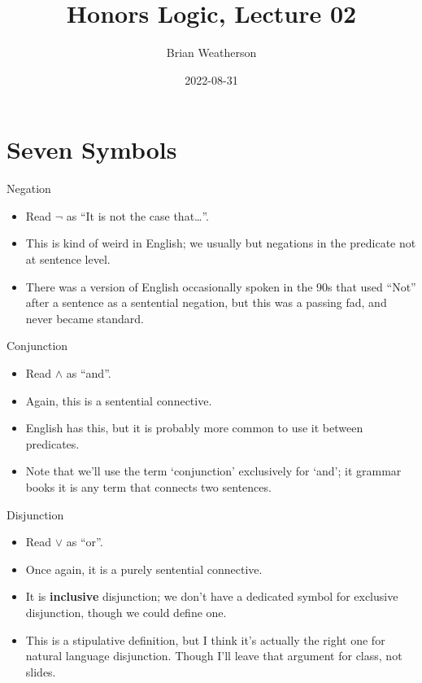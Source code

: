 \documentclass[
  17pt,
  letterpaper,
  ignorenonframetext,
  aspectratio=169,
]{beamer}
\title{Honors Logic, Lecture 02}
\author{Brian Weatherson}
\date{2022-08-31}
\providecommand{\tightlist}{%
  \setlength{\itemsep}{0pt}\setlength{\parskip}{0pt}}\usepackage{longtable,booktabs,array}
\begin{document}
\frame{\titlepage}
\ifdefined\Shaded\renewenvironment{Shaded}{\begin{tcolorbox}[enhanced, sharp corners, boxrule=0pt, frame hidden, breakable, interior hidden, borderline west={3pt}{0pt}{shadecolor}]}{\end{tcolorbox}}\fi

\hypertarget{seven-symbols}{%
\section{Seven Symbols}\label{seven-symbols}}

\begin{frame}{Negation}
\protect\hypertarget{negation}{}
\begin{itemize}[<+->]
\tightlist
\item
  Read \(\neg\) as ``It is not the case that\ldots{}''.
\item
  This is kind of weird in English; we usually but negations in the
  predicate not at sentence level.
\item
  There was a version of English occasionally spoken in the 90s that
  used ``Not'' after a sentence as a sentential negation, but this was a
  passing fad, and never became standard.
\end{itemize}
\end{frame}

\begin{frame}{Conjunction}
\protect\hypertarget{conjunction}{}
\begin{itemize}[<+->]
\tightlist
\item
  Read \(\wedge\) as ``and''.
\item
  Again, this is a sentential connective.
\item
  English has this, but it is probably more common to use it between
  predicates.
\item
  Note that we'll use the term `conjunction' exclusively for `and'; it
  grammar books it is any term that connects two sentences.
\end{itemize}
\end{frame}

\begin{frame}{Disjunction}
\protect\hypertarget{disjunction}{}
\begin{itemize}[<+->]
\tightlist
\item
  Read \(\vee\) as ``or''.
\item
  Once again, it is a purely sentential connective.
\item
  It is \textbf{inclusive} disjunction; we don't have a dedicated symbol
  for exclusive disjunction, though we could define one.
\item
  This is a stipulative definition, but I think it's actually the right
  one for natural language disjunction. Though I'll leave that argument
  for class, not slides.
\end{itemize}
\end{frame}
\end{document}
